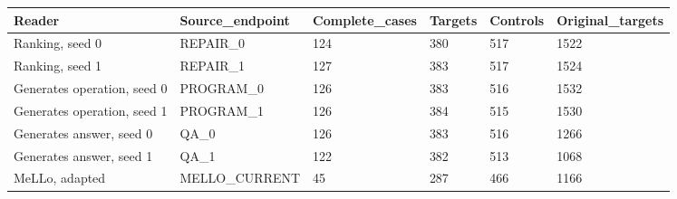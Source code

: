\begin{tabular}{llllll}
Reader & Source\_endpoint & Complete\_cases & Targets & Controls & Original\_targets \\
\hline
Ranking, seed 0 & REPAIR\_0 & 124 & 380 & 517 & 1522 \\
Ranking, seed 1 & REPAIR\_1 & 127 & 383 & 517 & 1524 \\
Generates operation, seed 0 & PROGRAM\_0 & 126 & 383 & 516 & 1532 \\
Generates operation, seed 1 & PROGRAM\_1 & 126 & 384 & 515 & 1530 \\
Generates answer, seed 0 & QA\_0 & 126 & 383 & 516 & 1266 \\
Generates answer, seed 1 & QA\_1 & 122 & 382 & 513 & 1068 \\
MeLLo, adapted & MELLO\_CURRENT & 45 & 287 & 466 & 1166 \\
\end{tabular}
